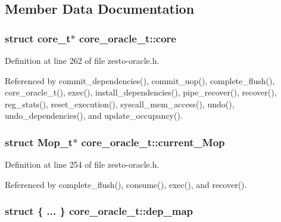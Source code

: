 \subsection{Member Data Documentation}
\subsubsection[{core}]{\setlength{\rightskip}{0pt plus 5cm}struct {\bf core\_\-t}$\ast$ {\bf core\_\-oracle\_\-t::core}\hspace{0.3cm}{\tt  [read, protected]}}\label{classcore__oracle__t_32fd14747d2d54dc5e0bc2ba7d118364}




Definition at line 262 of file zesto-oracle.h.

Referenced by commit\_\-dependencies(), commit\_\-uop(), complete\_\-flush(), core\_\-oracle\_\-t(), exec(), install\_\-dependencies(), pipe\_\-recover(), recover(), reg\_\-stats(), reset\_\-execution(), syscall\_\-mem\_\-access(), undo(), undo\_\-dependencies(), and update\_\-occupancy().
\subsubsection[{current\_\-Mop}]{\setlength{\rightskip}{0pt plus 5cm}struct {\bf Mop\_\-t}$\ast$ {\bf core\_\-oracle\_\-t::current\_\-Mop}\hspace{0.3cm}{\tt  [read, protected]}}\label{classcore__oracle__t_d1209b754eaf54cb0119beb43eea0929}




Definition at line 254 of file zesto-oracle.h.

Referenced by complete\_\-flush(), consume(), exec(), and recover().
\subsubsection[{dep\_\-map}]{\setlength{\rightskip}{0pt plus 5cm}struct \{ ... \}   {\bf core\_\-oracle\_\-t::dep\_\-map}\hspace{0.3cm}{\tt  [protected]}}\label{classcore__oracle__t_dff628c0529f5ffc29965d2699adf61a}




